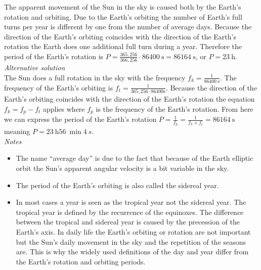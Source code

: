 \documentclass[11pt]{article}
\begin{document}
\solueng
The apparent movement of the Sun in the sky is caused both by the Earth’s rotation and orbiting. Due to the Earth’s orbiting the number of Earth’s full turns per year is different by one from the number of average days. Because the direction of the Earth’s orbiting coincides with the direction of the Earth’s rotation the Earth does one additional full turn during a year. Therefore the period of the Earth’s rotation is $P=\frac{365,256}{366,256} \cdot \SI{86400}{\second}=\SI{86164}{\second}$, or $P=\SI{23}{\hour}$.\\

\emph{Alternative solution}\\
The Sun does a full rotation in the sky with the frequency $f_k=\frac{1}{\SI{86400}{\second}}$. The frequency of the Earth’s orbiting is $f_t=\frac{1}{365,256\cdot86400\text{s}}$. Because the direction of the Earth’s orbiting coincides with the direction of the Earth’s rotation the equation $f_k=f_p-f_t$ applies where $f_p$ is the frequency of the Earth’s rotation. From here we can express the period of the Earth’s rotation $P=\frac{1}{f_p}=\frac{1}{f_k+f_t}=\SI{86164}{\second}$ meaning $P=\SI{23}{\hour} \SI{56}{\min} \SI{4}{s}$. \\

\emph{Notes}\\
\begin{itemize}
\item The name “average day” is due to the fact that because of the Earth elliptic orbit the Sun’s apparent angular velocity is a bit variable in the sky.
\item The period of the Earth’s orbiting is also called the sidereal year.
\item In most cases a year is seen as the tropical year not the sidereal year. The tropical year is defined by the recurrence of the equinoxes. The difference between the tropical and sidereal year is caused by the precession of the Earth’s axis. In daily life the Earth’s orbiting or rotation are not important but the Sun’s daily movement in the sky and the repetition of the seasons are. This is why the widely used definitions of the day and year differ from the Earth’s rotation and orbiting periods.
\end{itemize}
\probend
\bigskip

\end{document}
